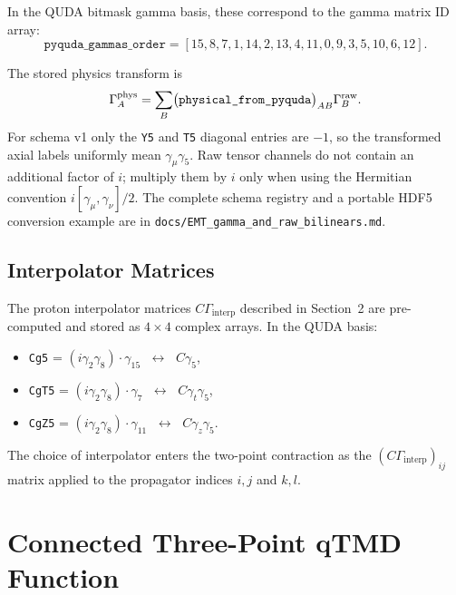 \documentclass[11pt,a4paper]{article}
\newcommand{\Gammaint}{\Gamma_{\text{interp}}}
\newcommand{\Cmat}{C}
\begin{document}
In the QUDA bitmask gamma basis, these correspond to the gamma matrix ID array:
\begin{equation}
  \texttt{pyquda\_gammas\_order} =
    [15, 8, 7, 1, 14, 2, 13, 4, 11, 0, 9, 3, 5, 10, 6, 12].
\end{equation}

The stored physics transform is
\begin{equation}
 \Gamma_A^{\rm phys}
 =\sum_B
 \bigl(\texttt{physical\_from\_pyquda}\bigr)_{AB}
 \Gamma_B^{\rm raw}.
\end{equation}
For schema v1 only the \texttt{Y5} and \texttt{T5} diagonal entries are
$-1$, so the transformed axial labels uniformly mean
$\gamma_\mu\gamma_5$.  Raw tensor channels do not contain an additional
factor of $i$; multiply them by $i$ only when using the Hermitian convention
$i[\gamma_\mu,\gamma_\nu]/2$.  The complete schema registry and a portable
HDF5 conversion example are in
\texttt{docs/EMT\_gamma\_and\_raw\_bilinears.md}.

\subsection{Interpolator Matrices}

The proton interpolator matrices $C\Gammaint$ described in Section~2 are
pre-computed and stored as $4 \times 4$ complex arrays. In the QUDA basis:

\begin{itemize}
  \item \texttt{Cg5}  = $(i\gamma_2 \gamma_8) \cdot \gamma_{15}$
    $\;\leftrightarrow\;$ $C\gamma_5$,
  \item \texttt{CgT5} = $(i\gamma_2 \gamma_8) \cdot \gamma_7$
    $\;\leftrightarrow\;$ $C\gamma_t\gamma_5$,
  \item \texttt{CgZ5} = $(i\gamma_2 \gamma_8) \cdot \gamma_{11}$
    $\;\leftrightarrow\;$ $C\gamma_z\gamma_5$.
\end{itemize}

The choice of interpolator enters the two-point contraction as the
$(\Cmat\Gammaint)_{ij}$ matrix applied to the propagator indices $i,j$ and $k,l$.

\section{Connected Three-Point qTMD Function}
\label{sec:three_point}
\end{document}
